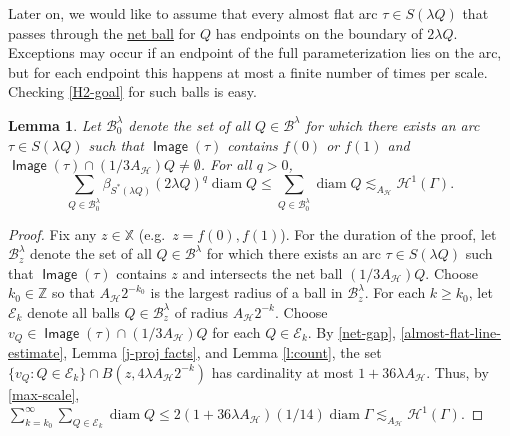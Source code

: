 \documentclass[12pt]{amsart}
\numberwithin{equation}{section}
\theoremstyle{plain}
\newtheorem{lemma}[theorem]{Lemma}
\theoremstyle{definition}
\def\ZZ{\mathbb{Z}}
\def\XX{{\mathbb{X}}}
\newcommand{\diam}{\mathop\mathrm{diam}\nolimits}
\newcommand{\Haus}{\mathcal{H}}
\newcommand{\Image}{\mathop\mathsf{Image}\nolimits}
\numberwithin{figure}{section}
\begin{document}
Later on, we would like to assume that every almost flat arc $\tau\in S(\lambda Q)$ that passes through the \hyperref[netball]{net ball} for $Q$ has endpoints on the boundary of $2\lambda Q$. Exceptions may occur if an endpoint of the full parameterization lies on the arc, but for each endpoint this happens at most a finite number of times per scale. Checking \eqref{H2-goal} for such balls is easy.

\begin{lemma}\label{l:B0} Let $\mathscr{B}^\lambda_0$ denote the set of all $Q\in\mathscr{B}^\lambda$ for which there exists an arc $\tau\in S(\lambda Q)$ such that $\Image(\tau)$ contains $f(0)$ or $f(1)$ and $\Image(\tau)\cap (1/3A_\mathscr{H})Q\neq\emptyset$. For all $q>0$, \begin{equation}\label{B0-sum}
\sum_{Q\in \mathscr{B}^\lambda_0} \beta_{S^*(\lambda Q)}(2\lambda Q)^q \diam Q \leq \sum_{Q\in\mathscr{B}^\lambda_0} \diam Q \lesssim_{A_\mathscr{H}} \Haus^1(\Gamma).\end{equation}
\end{lemma}

\begin{proof} Fix any $z\in\XX$ (e.g.~$z=f(0),f(1)$). For the duration of the proof, let $\mathscr{B}^\lambda_z$ denote the set of all $Q\in\mathscr{B}^\lambda$ for which there exists an arc $\tau\in S(\lambda Q)$ such that $\Image(\tau)$ contains $z$ and intersects the net ball $(1/3A_\mathscr{H})Q$. Choose $k_0\in\ZZ$ so that $A_\mathscr{H} 2^{-k_0}$ is the largest radius of a ball in $\mathscr{B}^\lambda_z$.  For each $k\geq k_0$, let $\mathscr{E}_k$ denote all balls $Q\in\mathscr{B}^\lambda_z$ of radius $A_\mathscr{H} 2^{-k}$. Choose $v_Q\in \Image(\tau)\cap (1/3A_\mathscr{H})Q$ for each $Q\in\mathscr{E}_k$. By \eqref{net-gap},  \eqref{almost-flat-line-estimate}, Lemma \ref{j-proj facts}, and Lemma \ref{l:count}, the set $\{v_Q: Q\in\mathscr{E}_k\} \cap B(z,4\lambda A_\mathscr{H} 2^{-k})$ has cardinality at most $1+36\lambda A_\mathscr{H}$. Thus, by \eqref{max-scale}, $\sum_{k=k_0}^\infty \sum_{Q\in\mathscr{E}_k} \diam Q \leq 2(1+36\lambda A_\mathscr{H})(1/14)\diam \Gamma\lesssim_{A_\mathscr{H}} \Haus^1(\Gamma)$.
\end{proof}
\end{document}
